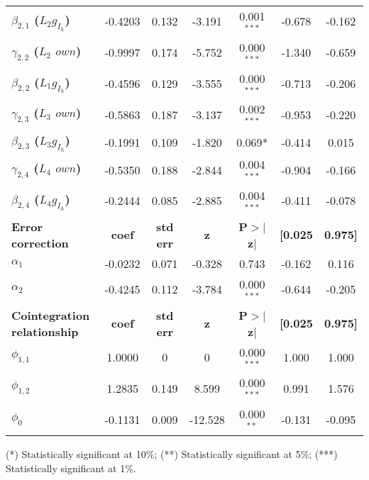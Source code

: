 \begin{threeparttable}
\begin{tabular}{lcccccc}
		\textbf{$\beta_{2,1}$ ($L_2 g_{I_h}$)}           &      -0.4203  &        0.132     &    -3.191  &         0.001$^{***}$        &       -0.678    &       -0.162     \\
		\textbf{$\gamma_{2,2}$ ($L_2$ $own$)} &      -0.9997  &        0.174     &    -5.752  &         0.000$^{***}$        &       -1.340    &       -0.659     \\
		\textbf{$\beta_{2,2}$ ($L_1 g_{I_h}$)}           &      -0.4596  &        0.129     &    -3.555  &         0.000$^{***}$        &       -0.713    &       -0.206     \\
		\textbf{$\gamma_{2,3}$ ($L_3$ $own$)} &      -0.5863  &        0.187     &    -3.137  &         0.002$^{***}$        &       -0.953    &       -0.220     \\
		\textbf{$\beta_{2,3}$ ($L_3 g_{I_h}$)}           &      -0.1991  &        0.109     &    -1.820  &         0.069*        &       -0.414    &        0.015     \\
		\textbf{$\gamma_{2,4}$ ($L_4$ $own$)} &      -0.5350  &        0.188     &    -2.844  &         0.004$^{***}$        &       -0.904    &       -0.166     \\
		\textbf{$\beta_{2,4}$ ($L_4 g_{I_h}$)}           &      -0.2444  &        0.085     &    -2.885  &         0.004$^{***}$        &       -0.411    &       -0.078     \\
		\midrule
		\textbf{Error correction} & \textbf{coef} & \textbf{std err} & \textbf{z} & \textbf{P$> |$z$|$} & \textbf{[0.025} & \textbf{0.975]}  \\
		\midrule
		\textbf{$\alpha_1$} &      -0.0232  &        0.071     &    -0.328  &         0.743        &       -0.162    &        0.116     \\
		\textbf{$\alpha_2$} &      -0.4245  &        0.112     &    -3.784  &         0.000$^{***}$        &       -0.644    &       -0.205     \\
		\midrule
		\textbf{Cointegration relationship} & \textbf{coef} & \textbf{std err} & \textbf{z} & \textbf{P$> |$z$|$} & \textbf{[0.025} & \textbf{0.975]}  \\
		\midrule
		\textbf{$\phi_{1,1}$} &       1.0000  &            0     &         0  &         0.000$^{***}$        &        1.000    &        1.000     \\
		\textbf{$\phi_{1,2}$} &       1.2835  &        0.149     &     8.599  &         0.000$^{***}$        &        0.991    &        1.576     \\
		\textbf{$\phi_0$}  &      -0.1131  &        0.009     &   -12.528  &         0.000$^{**}$       &       -0.131    &       -0.095     \\
		\hline
		\hline
	\end{tabular}
\footnotesize{(*) Statistically significant at 10\%; (**) Statistically significant at 5\%; (***) Statistically significant at 1\%.}
\end{threeparttable}